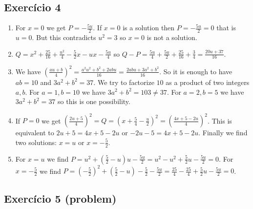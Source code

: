 \subsection*{Exercício 4}

\begin{enumerate}
\item For $x=0$ we get $P = -\frac{5u}{2}$. If $x=0$ is a solution then
  $P=-\frac{5u}{2}=0$ that is $u=0$. But this contradicts $u^2 = 3$ so
  $x=0$ is not a solution.
\item
  $Q = x^2 + \frac{25}{16}+\frac{u^2}{4} - \frac{5}{2}x - ux - \frac{5u}{4}$
  so $Q - P = \frac{5u}{4} + \frac{5u}{2} + \frac{25}{16} + \frac{3}{4} =
  \frac{20u+37}{16}$.
\item We have $\left(\frac{au+b}{4}\right)^2 = \frac{a^2u^2+b^2+2abu}{16} =
  \frac{2abu + 3a^2+b^2}{16}$. So it is enough to
  have $ab = 10$ and $3a^2+b^2=37$. We try to factorize $10$ as a product
  of two integers $a,b$. For $a=1,b=10$ we have $3a^2+b^2=103 \neq 37$.
  For $a=2,b=5$ we have $3a^2+b^2 = 37$ so this is one possibility.
\item If $P=0$ we get
  $\left(\frac{2u+5}{4}\right)^2 = Q =
  \left(x + \frac{5}{4} - \frac{u}{2}\right)^2 =
  \left(\frac{4x+5-2u}{4}\right)^2$. This is equivalent to
  $2u+5 = 4x+5-2u$ or $-2u-5 = 4x+5-2u$.
  Finally we find two solutions: $x = u$ or $x = -\frac{5}{2}$.
\item For $x=u$ we find
  $P=u^2 + \left(\frac{5}{2} - u\right)u - \frac{5u}{2} =
  u^2 - u^2 + \frac{5}{2}u - \frac{5u}{2} = 0$. For $x = -\frac{5}{2}$
  we find
  $P = \left(-\frac{5}{2}\right)^2 + \left(\frac{5}{2} - u\right) -\frac{5}{2}
  - \frac{5u}{2} =
  \frac{25}{4}  -\frac{25}{4} + \frac{5}{2}u - \frac{5u}{2} = 0$.
\end{enumerate}

\subsection*{Exercício 5 (problem)}

